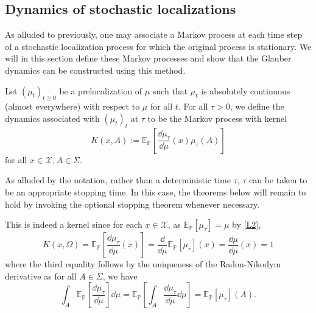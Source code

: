 \subsection{Dynamics of stochastic localizations}

As alluded to previously, one may associate a Markov process at each time step of a stochastic 
localization process for which the original process is stationary. We will in this section define 
these Markov processes and show that the Glauber dynamics can be constructed using this method. 

\begin{definition}
  Let \((\mu_t)_{t \ge 0}\) be a prelocalization of \(\mu\) such that \(\mu_t\) is absolutely 
  continuous (almost everywhere) with respect to \(\mu\) for all \(t\). For all \(\tau > 0\), we define the dynamics 
  associated with \((\mu_t)_t\) at \(\tau\) to be the Markov process with kernel 
  \[K(x, A) := \mathbb{E}_\mathbb{P}\left[\frac{\dd \mu_\tau}{\dd \mu}(x) \mu_\tau(A)\right]\]
  for all \(x \in \mathcal{X}, A \in \Sigma\).
\end{definition}

As alluded by the notation, rather than a deterministic time \(\tau\), \(\tau\) can be taken to be an 
appropriate stopping time. In this case, the theorems below will remain to hold by invoking the optional stopping 
theorem whenever necessary.

This is indeed a kernel since for each \(x \in \mathcal{X}\), as \(\mathbb{E}_\mathbb{P}[\mu_\tau] = \mu\) 
by \ref{L2},
\[K(x, \Omega) = \mathbb{E}_\mathbb{P}\left[\frac{\dd \mu_\tau}{\dd \mu}(x)\right] 
  = \frac{\dd}{\dd \mu}\mathbb{E}_\mathbb{P}[\mu_\tau](x) = \frac{\dd \mu}{\dd \mu}(x) = 1\]
where the third equality follows by the uniqueness of the Radon-Nikodym derivative as for all \(A \in \Sigma\), 
we have
\[\int_A \mathbb{E}_\mathbb{P}\left[\frac{\dd \mu_\tau}{\dd \mu}\right] \dd \mu = 
  \mathbb{E}_\mathbb{P}\left[\int_A \frac{\dd \mu_\tau}{\dd \mu} \dd \mu \right] = 
  \mathbb{E}_\mathbb{P}[\mu_\tau](A).\]

